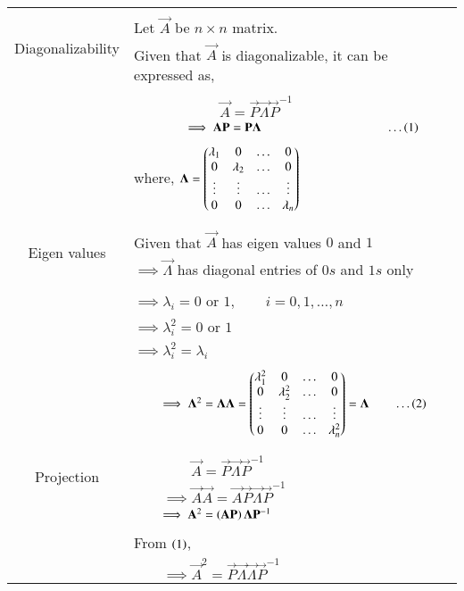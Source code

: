 \begin{longtable}{|c|l|}
    \hline
	\multirow{3}{*}{Diagonalizability} 
	& \\
	& Let $\vec{A}$ be $n\times n$ matrix.\\
	& Given that $\vec{A}$ is diagonalizable, it can be expressed as,\\
	&\\
	& $\qquad \qquad\qquad \vec{A}=\vec{P}\vec{\Lambda}\vec{P}^{-1}$\\
	& $\qquad\qquad\implies \mathbf{A}\mathbf{P}=\mathbf{P}\mathbf{\Lambda}\qquad\qquad\qquad\qquad\qquad\dots\left(1\right)$\\
	&\\
	& where, $\mathbf{\Lambda}=\begin{pmatrix}\lambda_1&0&\dots&0\\0&\lambda_2&\dots&0\\ \vdots&\vdots&\dots&\vdots\\0&0&\dots&\lambda_n\end{pmatrix}$\\
	&\\
	\hline
	\multirow{3}{*}{Eigen values} & \\
	& Given that $\vec{A}$ has eigen values $0$ and $1$\\
	&$\implies \vec{\Lambda}$ has diagonal entries of $0s$ and $1s$ only\\ 
	&\\
	&$\implies \lambda_i=0$ or $1,\qquad i=0,1,\dots,n$\\
	&$\implies \lambda_i^2=0$ or $1$\\
	&$\implies \lambda_i^2=\lambda_i$\\
	&\\
	& $\qquad\implies \Vec{\Lambda}^2=\Vec{\Lambda}\Vec{\Lambda}=\myvec{\lambda_1^2&0&\dots&0\\0&\lambda_2^2&\dots&0\\ \vdots&\vdots&\dots&\vdots\\0&0&\dots&\lambda_n^2}=\vec{\Lambda}\qquad\dots\brak{2}$\\
	&\\
	\hline
	\multirow{3}{*}{Projection}&\\ 
	&$\qquad\qquad\vec{A}=\vec{P}\vec{\Lambda}\vec{P}^{-1}$\\
	&$\qquad\implies \vec{A}\vec{A}=\vec{A}\vec{P}\vec{\Lambda}\vec{P}^{-1}$\\
	&$\qquad\implies \mathbf{A}^2=\left(\mathbf{A}\mathbf{P}\right)\mathbf{\Lambda}\mathbf{P}^{-1}$\\
	&\\
	&From $\left(1\right)$,\\
	&$\qquad\implies \vec{A}^2=\vec{P}\vec{\Lambda}\vec{\Lambda}\vec{P}^{-1}$\\

\end{longtable}
